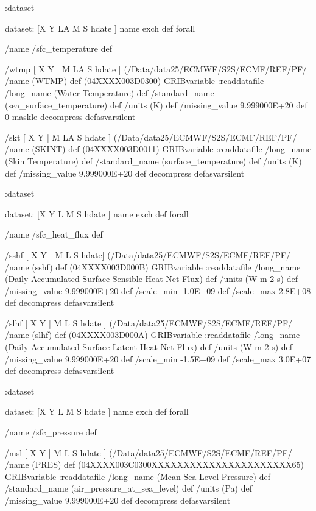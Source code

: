 \begin{ingrid}
{:dataset

dataset:
[X Y LA M S hdate ] {name exch def } forall

/name /sfc_temperature def

/wtmp { [ X Y | M LA S hdate ] (/Data/data25/ECMWF/S2S/ECMF/REF/PF/%
/name (WTMP) def
(04XXXX003D0300) GRIBvariable
:readdatafile
/long_name (Water Temperature) def
/standard_name (sea_surface_temperature) def
/units (K) def
/missing_value 9.999000E+20 def
0 maskle
decompress
} defasvarsilent

/skt { [ X Y | M LA S hdate ] (/Data/data25/ECMWF/S2S/ECMF/REF/PF/%
/name (SKINT) def
(04XXXX003D0011) GRIBvariable
:readdatafile
/long_name (Skin Temperature) def
/standard_name (surface_temperature) def
/units (K) def
/missing_value 9.999000E+20 def
decompress
} defasvarsilent

:dataset

dataset:
[X Y L M S hdate ] {name exch def } forall

/name /sfc_heat_flux def

/sshf { [ X Y | M L S hdate] (/Data/data25/ECMWF/S2S/ECMF/REF/PF/%
/name (sshf) def
(04XXXX003D000B) GRIBvariable
:readdatafile
/long_name (Daily Accumulated Surface Sensible Heat Net Flux) def
/units (W m-2 s) def
/missing_value 9.999000E+20 def
/scale_min -1.0E+09 def
/scale_max 2.8E+08 def
decompress
} defasvarsilent

/slhf { [ X Y | M L S hdate ] (/Data/data25/ECMWF/S2S/ECMF/REF/PF/%
/name (slhf) def
(04XXXX003D000A) GRIBvariable
:readdatafile
/long_name (Daily Accumulated Surface Latent Heat Net Flux) def
/units (W m-2 s) def
/missing_value 9.999000E+20 def
/scale_min -1.5E+09 def
/scale_max 3.0E+07 def
decompress
} defasvarsilent

:dataset

dataset:
[X Y L M S hdate ] {name exch def } forall

/name /sfc_pressure def

/msl { [ X Y | M L S hdate ] (/Data/data25/ECMWF/S2S/ECMF/REF/PF/%
/name (PRES) def
(04XXXX003C0300XXXXXXXXXXXXXXXXXXXXXX65) GRIBvariable
:readdatafile
/long_name (Mean Sea Level Pressure) def
/standard_name (air_pressure_at_sea_level) def
/units (Pa) def
/missing_value 9.999000E+20 def
decompress
} defasvarsilent

}
\end{ingrid}
